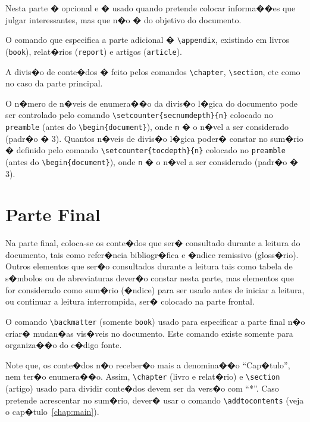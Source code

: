 \documentclass[12pt,a4paper,oneside, openany, titlepage]{book}
\begin{document}
{Nesta parte � opcional e � usado quando pretende colocar informa��es 
que julgar interessantes, mas que n�o � do objetivo do documento. 

O comando que especifica a parte adicional � 
\verb+\appendix+, existindo em livros (\texttt{book}), 
relat�rios (\texttt{report}) e artigos (\texttt{article}).

A divis�o de conte�dos � feito pelos comandos
\verb+\chapter+, \verb+\section+, etc como no caso da parte principal.

O n�mero de n�veis de enumera��o da divis�o l�gica do documento 
pode ser controlado pelo comando
\verb|\setcounter{secnumdepth}{n}| 
colocado no \texttt{preamble} (antes do \verb|\begin{document}|),
onde \verb|n| � o n�vel a ser considerado (padr�o � 3).
Quantos n�veis de divis�o l�gica poder� constar no sum�rio � 
definido pelo comando \verb|\setcounter{tocdepth}{n}|
colocado no \texttt{preamble} (antes do \verb|\begin{document}|),
onde \verb|n| � o n�vel a ser considerado (padr�o � 3).

\chapter{Parte Final}  \label{chap:back}
Na parte final, coloca-se os conte�dos que ser� consultado durante a 
leitura do documento, tais como refer�ncia bibliogr�fica e 
�ndice remissivo (gloss�rio).
Outros elementos que ser�o consultados durante a leitura tais como 
tabela de s�mbolos ou de abreviaturas dever�o constar nesta parte, 
mas elementos que for considerado como sum�rio (�ndice) para
ser usado antes de iniciar a leitura, ou continuar a leitura interrompida,
ser� colocado na parte frontal.

O comando \verb+\backmatter+ (somente \texttt{book}) usado para 
especificar a parte final n�o criar� mudan�as vis�veis no documento. 
Este comando existe somente para organiza��o do c�digo fonte.

Note que, os conte�dos n�o receber�o mais a denomina��o ``Cap�tulo'', 
nem ter�o enumera��o. 
Assim, \verb+\chapter+ (livro e relat�rio) e \verb+\section+ (artigo) 
usado para dividir conte�dos devem ser da vers�o com ``*''. 
Caso pretende acrescentar no sum�rio, dever� usar 
o comando \verb+\addtocontents+ (veja o cap�tulo~\ref{chap:main}).

}
\end{document}

